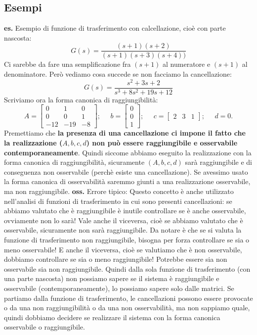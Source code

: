 \subsection{Esempi}
\textbf{es.} Esempio di funzione di trasferimento con calcellazione, cioè con parte nascosta:
\[
    G(s) = \frac{(s+1) (s+2)}{(s+1)(s+3)(s+4))}
\]
Ci sarebbe da fare una semplificazione fra $(s+1)$ al numeratore e $(s+1)$ al denominatore. Però vediamo cosa succede se non facciamo la cancellazione:
\[
    G(s) = \frac{s^2 + 3s + 2}{s^3+8s^2 +19 s + 12}
\]
Scriviamo ora la forma canonica di raggiungibilità:
\[
    A= \left[\begin{matrix}
        0 & 1 & 0\\
        0 & 0 & 1\\
        -12 & -19 & -8
    \end{matrix}\right]; \;\;\;\;\;b = \left[\begin{matrix}
        0 \\0\\1
    \end{matrix}\right]; \;\;\;\;\; c=\left[\begin{matrix}
        2&3&1
    \end{matrix}\right]; \;\;\;\;\;d=0.
\]
Premettiamo che \textbf{la presenza di una cancellazione ci impone il fatto che la realizzazione ($A,b,c,d$) non può essere raggiungibile e osservabile contemporaneamente}. Quindi siccome abbiamo eseguito la realizzazione con la forma canonica di raggiungibilità, sicuramente $(A,b,c,d)$ sarà raggiungibile e di conseguenza non osservabile (perchè esiste una cancellazione). Se avessimo usato la forma canonica di osservabilità saremmo giunti a una realizzazione osservabile, ma non raggiungibile.\newline
\newline
\textbf{oss.} Errore tipico: Questo concetto è anche utilizzato nell'analisi di funzioni di trasferimento in cui sono presenti cancellazioni: se abbiamo valutato che è raggiungibile è inutile controllare se è anche osservabile, ovviamente non lo sarà! Vale anche il viceversa, cioè se abbiamo valutato che è osservabile, sicuramente non sarà raggiungibile. Da notare è che se si valuta la funzione di trasferimento non raggiungibile, bisogna per forza controllare se sia o meno osservabile! E anche il viceversa, cioè se valutiamo che è non osservabile, dobbiamo controllare se sia o meno raggiungibile! Potrebbe essere sia non osservabile sia non raggiungibile.
\newline
\newline
Quindi dalla sola funzione di trasferimento (con una parte nascosta) non possiamo sapere se il sistema è raggiungibile e osservabile (contemporaneamente), lo possiamo sapere solo dalle matrici. Se partiamo dalla funzione di trasferimento, le cancellazioni possono essere provocate o da una non raggiungibilità o da una non osservabilità, ma non sappiamo quale, quindi dobbiamo decidere se realizzare il sistema con la forma canonica osservabile o raggiungibile.
\newpage

